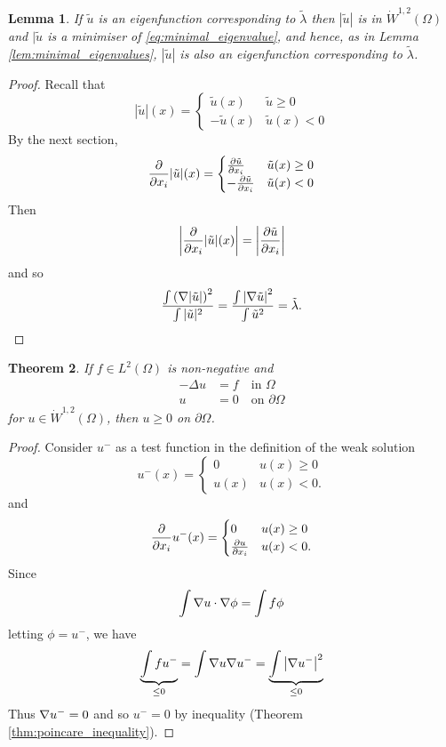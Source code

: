 \documentclass[10pt, oneside, reqno]{amsart}
\theoremstyle{plain}%
\newtheorem{thm}{Theorem}[section]
\newtheorem{lem}[thm]{Lemma}
\numberwithin{equation}{section}
\theoremstyle{definition}
\theoremstyle{remark}
\begin{document}
\begin{lem}
    If $\tilde u$ is an eigenfunction corresponding to $\tilde \lambda$ then $|\tilde u |$ is in $\dot W^{1, 2}(\Omega)$ and $|\tilde u$ is a minimiser of \eqref{eq:minimal_eigenvalue}, and hence, as in Lemma \ref{lem:minimal_eigenvalues}, $|\tilde u|$ is also an eigenfunction corresponding to $\tilde \lambda$.   
\end{lem}


\begin{proof}
    
Recall that \[
    |\tilde u |(x) = \begin{cases}
        \tilde u(x)     & \tilde u \geq 0 \\
        -\tilde u(x)    & \tilde u(x) < 0
    \end{cases}
\]  By the next section, \[
    \frac{\partial }{\partial x_i}|\tilde u|(x) = \begin{cases}
        \frac{\partial \tilde u}{\partial x_i}  & \tilde u(x) \geq 0 \\
        -\frac{\partial \tilde u}{\partial x_i} & \tilde u(x) < 0 \\
    \end{cases}
\]  Then \[
    \left| \frac{\partial }{\partial x_i} |\tilde u|(x) \right| = \left| \frac{\partial \tilde u}{\partial x_i} \right|
\] and so \[
    \frac{\int \left(\nabla|\tilde u| \right)^2}{\int |\tilde u |^2}  = \frac{\int \left| \nabla \tilde u \right|^2}{\int \tilde u^2} = \tilde \lambda. \qedhere
\]
\end{proof}

\begin{thm}
    If $f \in L^2(\Omega)$ is non-negative and \begin{align*}
        -\Delta u &= f \quad \text{in $\Omega$} \\
        u &= 0 \quad \text{on $\partial \Omega$}
    \end{align*} for $u \in \dot W^{1, 2}(\Omega)$, then $u \geq 0$ on $\partial \Omega$.  
\end{thm}

\begin{proof}
    Consider $u^-$ as a test function in the definition of the weak solution \[
        u^-(x) = \begin{cases}
            0       & u(x) \geq 0 \\
            u(x)    & u(x) < 0.
        \end{cases}
    \] and \[
     \frac{\partial }{\partial x_i}u^-(x) = \begin{cases}
            0               & u(x) \geq 0 \\
            \frac{\partial u}{\partial x_i} & u(x) < 0.
        \end{cases}
    \]  Since \[
        \int \nabla u  \cdot \nabla \phi = \int f \phi
    \] letting $\phi = u^-$, we have \[
    \underbrace{\int f u^{-}}_{\leq 0} = \int \nabla u \nabla u^- = \underbrace{\int \left| \nabla u^- \right|^2 }_{\leq 0}
    \]  Thus $\nabla u^- = 0$ and so $u^- = 0$ by \poincare inequality (Theorem \ref{thm:poincare_inequality}).
\end{proof}
\end{document}
